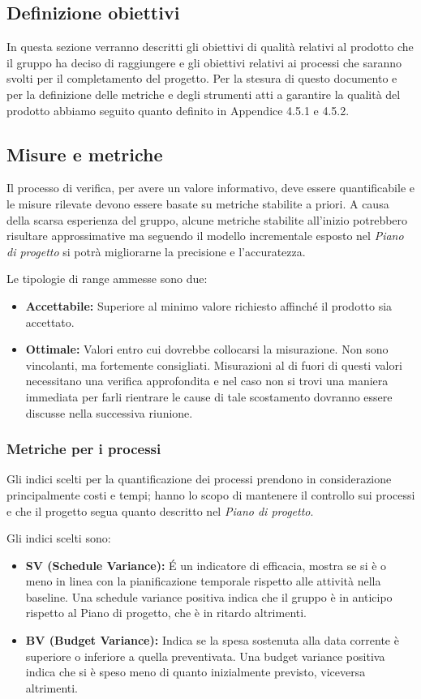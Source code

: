 \documentclass[a4paper]{article}
\begin{document}
			\subsection{Definizione obiettivi}
			In questa sezione verranno descritti gli obiettivi di qualità relativi al prodotto che il 
			gruppo ha deciso di raggiungere e gli obiettivi relativi ai processi che saranno svolti per 
			il completamento del progetto.
			Per la stesura di questo documento e per la definizione delle metriche e degli strumenti atti a garantire la qualità del prodotto abbiamo seguito quanto definito in Appendice 4.5.1 e 4.5.2. 
	
\subsection{Misure e metriche}
			 Il processo di verifica, per avere un valore informativo, deve essere quantificabile e le misure rilevate
 devono essere basate su metriche stabilite a priori. 
 A causa della scarsa esperienza del gruppo, alcune metriche stabilite all'inizio potrebbero risultare approssimative ma
 seguendo il modello incrementale esposto nel \emph{Piano di progetto} si potrà migliorarne la precisione e l'accuratezza.

			Le tipologie di range ammesse sono due:
			\begin{itemize}
				\item \textbf{Accettabile:} Superiore al minimo valore richiesto affinché il prodotto sia accettato.
				\item \textbf{Ottimale:} Valori entro cui dovrebbe collocarsi la misurazione. Non sono vincolanti,
				ma fortemente consigliati. Misurazioni al di fuori di questi valori necessitano una verifica approfondita e nel
				caso non si trovi una maniera immediata per farli rientrare le cause di tale scostamento dovranno essere
				discusse nella successiva riunione.
			\end{itemize}
			\subsubsection{Metriche per i processi}
				Gli indici scelti per la quantificazione dei processi prendono in considerazione principalmente costi e tempi;
				hanno lo scopo di mantenere il controllo sui processi e che il progetto segua quanto descritto nel \emph{Piano di
				progetto}.
				
				Gli indici scelti sono:
				\begin{itemize}
					\item \textbf{SV (Schedule Variance):} É un indicatore di efficacia, mostra se si è o meno in linea con la
					pianificazione temporale rispetto alle attività nella baseline. Una schedule variance positiva indica che il
					gruppo è in anticipo rispetto al Piano di progetto, che è in ritardo altrimenti.
					\item \textbf{BV (Budget Variance):} Indica se la spesa sostenuta alla data corrente è superiore o inferiore a
					quella preventivata. Una budget variance positiva indica che si è speso meno di quanto inizialmente previsto,
					viceversa altrimenti.		
				\end{itemize}
				
\end{document}
